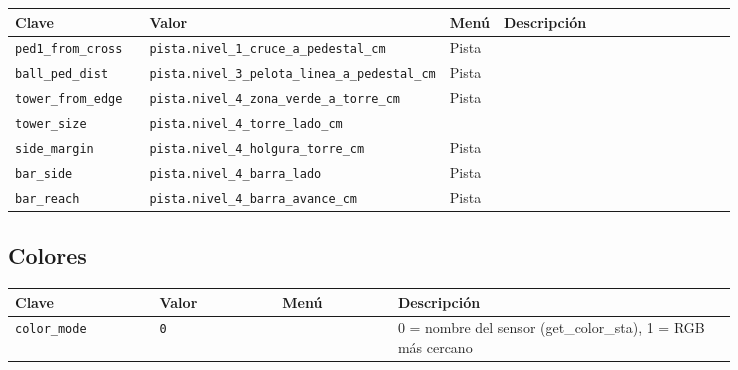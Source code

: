\begin{longtable}{@{}p{0.2\linewidth}p{0.17\linewidth}lp{0.47\linewidth}@{}}\toprule
\textbf{Clave} & \textbf{Valor} & \textbf{Men\'u} & \textbf{Descripci\'on} \\\midrule\endhead
\texttt{ped1\_\allowbreak{}from\_\allowbreak{}cross} & \texttt{pista.nivel\_\allowbreak{}1\_\allowbreak{}cruce\_\allowbreak{}a\_\allowbreak{}pedestal\_\allowbreak{}cm} & Pista &  \\
\texttt{ball\_\allowbreak{}ped\_\allowbreak{}dist} & \texttt{pista.nivel\_\allowbreak{}3\_\allowbreak{}pelota\_\allowbreak{}linea\_\allowbreak{}a\_\allowbreak{}pedestal\_\allowbreak{}cm} & Pista &  \\
\texttt{tower\_\allowbreak{}from\_\allowbreak{}edge} & \texttt{pista.nivel\_\allowbreak{}4\_\allowbreak{}zona\_\allowbreak{}verde\_\allowbreak{}a\_\allowbreak{}torre\_\allowbreak{}cm} & Pista &  \\
\texttt{tower\_\allowbreak{}size} & \texttt{pista.nivel\_\allowbreak{}4\_\allowbreak{}torre\_\allowbreak{}lado\_\allowbreak{}cm} &  &  \\
\texttt{side\_\allowbreak{}margin} & \texttt{pista.nivel\_\allowbreak{}4\_\allowbreak{}holgura\_\allowbreak{}torre\_\allowbreak{}cm} & Pista &  \\
\texttt{bar\_\allowbreak{}side} & \texttt{pista.nivel\_\allowbreak{}4\_\allowbreak{}barra\_\allowbreak{}lado} & Pista &  \\
\texttt{bar\_\allowbreak{}reach} & \texttt{pista.nivel\_\allowbreak{}4\_\allowbreak{}barra\_\allowbreak{}avance\_\allowbreak{}cm} & Pista &  \\
\bottomrule\end{longtable}
\subsection*{Colores}
\begin{longtable}{@{}p{0.2\linewidth}p{0.17\linewidth}lp{0.47\linewidth}@{}}\toprule
\textbf{Clave} & \textbf{Valor} & \textbf{Men\'u} & \textbf{Descripci\'on} \\\midrule\endhead
\texttt{color\_\allowbreak{}mode} & \texttt{0} &  & 0 = nombre del sensor (get\_color\_sta), 1 = RGB más cercano \\
\bottomrule\end{longtable}
